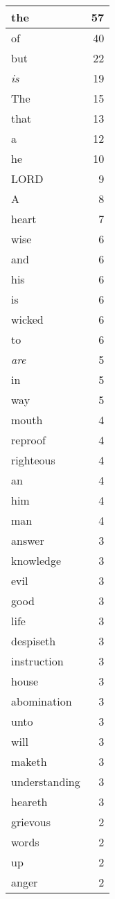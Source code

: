 \begin{center}
\begin{longtable}{l|r}
the & 57\\ \hline 
of & 40\\ \hline 
but & 22\\ \hline 
\emph{is} & 19\\ \hline 
The & 15\\ \hline 
that & 13\\ \hline 
a & 12\\ \hline 
he & 10\\ \hline 
LORD & 9\\ \hline 
A & 8\\ \hline 
heart & 7\\ \hline 
wise & 6\\ \hline 
and & 6\\ \hline 
his & 6\\ \hline 
is & 6\\ \hline 
wicked & 6\\ \hline 
to & 6\\ \hline 
\emph{are} & 5\\ \hline 
in & 5\\ \hline 
way & 5\\ \hline 
mouth & 4\\ \hline 
reproof & 4\\ \hline 
righteous & 4\\ \hline 
an & 4\\ \hline 
him & 4\\ \hline 
man & 4\\ \hline 
answer & 3\\ \hline 
knowledge & 3\\ \hline 
evil & 3\\ \hline 
good & 3\\ \hline 
life & 3\\ \hline 
despiseth & 3\\ \hline 
instruction & 3\\ \hline 
house & 3\\ \hline 
abomination & 3\\ \hline 
unto & 3\\ \hline 
will & 3\\ \hline 
maketh & 3\\ \hline 
understanding & 3\\ \hline 
heareth & 3\\ \hline 
grievous & 2\\ \hline 
words & 2\\ \hline 
up & 2\\ \hline 
anger & 2\\ \hline 

\end{longtable}
\end{center}
